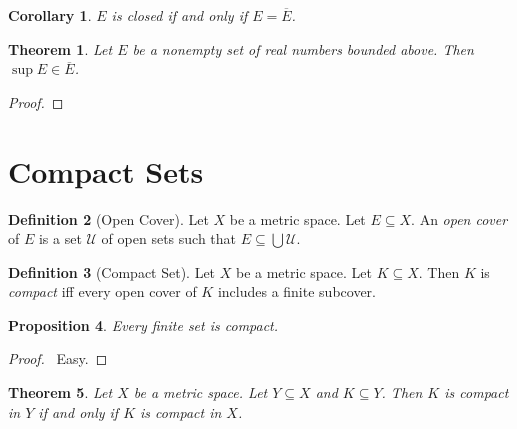 \documentclass{book}
\let\qed\relax
\newtheorem{prop}{Proposition}[chapter]
\newtheorem{cor}{Corollary}[prop]
\newtheorem{thm}[prop]{Theorem}
\theoremstyle{definition}
\newtheorem{df}[prop]{Definition}
\begin{document}
\begin{cor}
$E$ is closed if and only if $E = \overline{E}$.
\end{cor}

\begin{thm}
Let $E$ be a nonempty set of real numbers bounded above. Then $\sup E \in \overline{E}$.
\end{thm}

\begin{proof}
\pf
{}
\qed
\end{proof}

\section{Compact Sets}

\begin{df}[Open Cover]
Let $X$ be a metric space. Let $E \subseteq X$. An 
\emph{open cover} of $E$ is a set $\mathcal{U}$ of open sets such that $E \subseteq \bigcup \mathcal{U}$.
\end{df}

\begin{df}[Compact Set]
Let $X$ be a metric space. Let $K \subseteq X$. Then $K$ is \emph{compact} iff every open cover of $K$ includes a finite subcover.
\end{df}

\begin{prop}
Every finite set is compact.
\end{prop}

\begin{proof}
\pf\ Easy. \qed
\end{proof}

\begin{thm}
Let $X$ be a metric space. Let $Y \subseteq X$ and $K \subseteq Y$. Then $K$ is compact in $Y$ if and only if $K$ is compact in $X$.
\end{thm}
\end{document}
